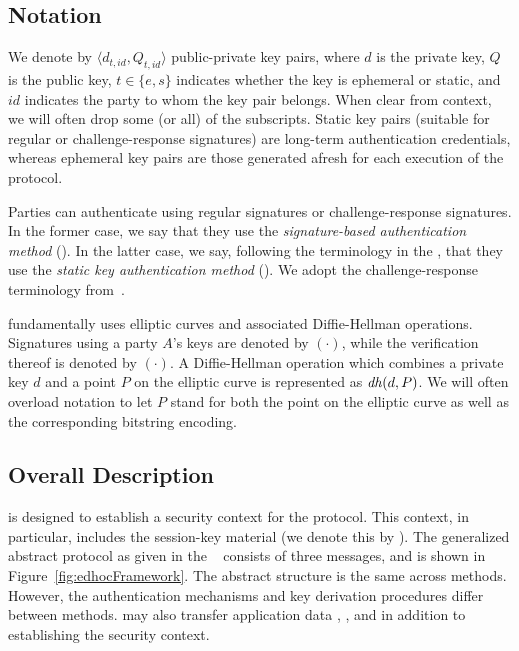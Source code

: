 \documentclass[runningheads]{llncs}
\begin{document}
\subsection{Notation}
\label{sec:notation}
We denote by $\langle d_{t, \mathit{id}}, Q_{t, \mathit{id}}\rangle$
public-private key pairs, where $d$ is the private key, $Q$ is the public key,
$t \in \{e, s\}$ indicates whether the key is ephemeral or static,
and $\mathit{id}$ indicates the party to whom the key pair belongs.
%
When clear from context, we will often drop some (or all) of the subscripts.
%
Static key pairs (suitable for regular or challenge-response signatures)
are long-term authentication credentials, whereas ephemeral key pairs are
those generated afresh for each execution of the protocol.
%

Parties can authenticate using regular signatures or challenge-response
signatures.
%
In the former case, we say that they use the
\emph{signature-based authentication method} (\mSig{}).
%
In the latter case, we say, following the terminology in the \mSpec{},
that they use the \emph{static key authentication method} (\mStat{}).
%
We adopt the challenge-response terminology
from~\cite{DBLP:conf/crypto/Krawczyk05}.
%

\mEdhoc{} fundamentally uses elliptic curves and associated Diffie-Hellman
operations.
%
Signatures using a party $A$'s keys are denoted by $(\cdot)$, while
the verification thereof is denoted by $(\cdot)$.
%
A Diffie-Hellman operation which combines a private key $d$ and a point $P$
on the elliptic curve is represented as $\mathit{dh}(d, P)$.
%
We will often overload notation to let $P$ stand for both the point on the
elliptic curve as well as the corresponding bitstring encoding.

\subsection{Overall Description}
\label{sec:description}
\mEdhoc{} is designed to establish a security context for the \mOscore{} protocol.
%
This context, in particular, includes the session-key material (we denote this by
\mSessKey{}).
%
The generalized abstract protocol as given in the \mSpec{}~\cite{our-analysis-selander-lake-edhoc-00} consists of three
messages, and is shown in Figure~\ref{fig:edhocFramework}.
%
The abstract structure is the same across methods.
%
However, the authentication mechanisms and key derivation procedures differ between
methods.
%
\mEdhoc{} may also transfer application data \mADone{}, \mADtwo{}, and \mADthree{} in
addition to establishing the \mOscore{} security context.
%
\end{document}
